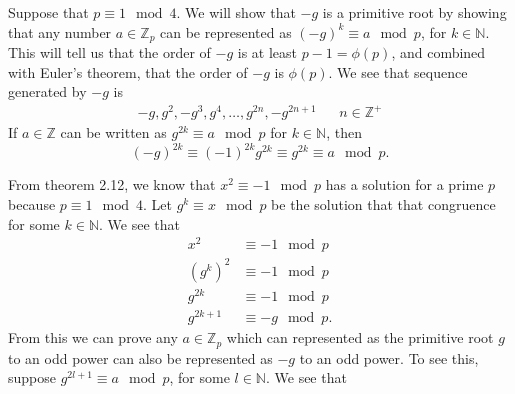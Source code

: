 \documentclass[12 pt]{amsart}
\begin{document}
  Suppose that $p \equiv 1 \mod 4$. 
  We will show that $-g$ is a primitive root by showing that 
  any number $a \in \mathbb{Z}_p$ can be represented as 
  $(-g)^k \equiv a \mod p$, for $k \in \mathbb{N}$.
  This will tell us that the order of $-g$ is at least 
  $p-1 = \phi(p)$, and combined with Euler's theorem, that
  the order of $-g$ is $\phi(p)$. 
  We see that sequence generated by $-g$ is 
  \begin{align*}
    -g, g^2, -g^3, g^4, \ldots, g^{2n}, -g^{2n+1} && n \in \mathbb{Z}^+
  \end{align*}
  If $a \in \mathbb{Z}$ can be written as $g^{2k} \equiv a \mod p$ for
  $k \in \mathbb{N}$, then 
  \[
    (-g)^{2k} \equiv (-1)^{2k} g^{2k} \equiv g^{2k} \equiv a \mod p.
  \]
  
  From theorem 2.12, we know that $x^2 \equiv -1 \mod p$ has a solution
  for a prime $p$ because $p \equiv 1 \mod 4$. 
  Let $g^k \equiv x \mod p$ be the solution that that congruence
  for some $k \in \mathbb{N}$. 
  We see that
  \begin{align*}
    x^2     &\equiv -1 \mod p \\
    (g^k)^2 &\equiv -1 \mod p \\
    g^{2k}  &\equiv -1 \mod p \\
    g^{2k+1} &\equiv -g \mod p.
  \end{align*}
  From this we can prove any $a \in \mathbb{Z}_p$ which can 
  represented as the primitive root $g$ to an odd power
  can also be represented as $-g$ to an odd power. 
  To see this, suppose $g^{2l + 1} \equiv a \mod p$,
  for some $l \in \mathbb{N}$. 
  We see that 
\end{document}
